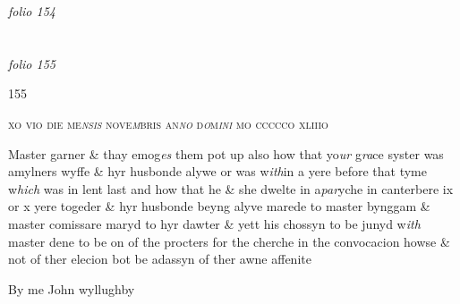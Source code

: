 \documentclass[12pt, a4paper]{book}
\begin{document}
\dotfill
					

\textit{folio 154}


         \vspace{4cm}
         
\dotfill
					  \section*{}  \subsection*{}

\textit{folio 155}



\begin{flushright}{\color{Mahogany}155}\end{flushright}
 
				\begin{center} \begin{large} {\scshape xo vio die me\textit{nsis} nove\textit{m}bris an\textit{no }d\textit{o}m\textit{ini} mo ccccco xliiio} \end{large} \end{center}
			

		\ifthenelse{\isodd{\thepage}}
		{\reversemarginpar}
		{\normalmarginpar}
		Master garner \& thay emog\textit{es} them pot up also how that
 yo\textit{ur} g\textit{ra}ce syster was amylners wyffe \& hyr husbonde alywe
 or was w\textit{ith}in a yere before that tyme w\textit{hich} was in lent last
			 and how that he
	\& she dwelte in a\textit{par}yche in canterbere ix or x yere
 togeder \& hyr husbonde beyng alyve marede to
	master bynggam \& master comissare maryd to hyr
 dawter \& yett his chossyn to be junyd w\textit{ith} master
 dene to be on of the procters for the cherche
 in the convocacion howse \& not of ther elecion
 bot be adassyn of ther awne affenite
			
 
		\ifthenelse{\isodd{\thepage}}
		{\reversemarginpar}
		{\normalmarginpar}
		By me John wyllughby

\dotfill
					
\end{document}
